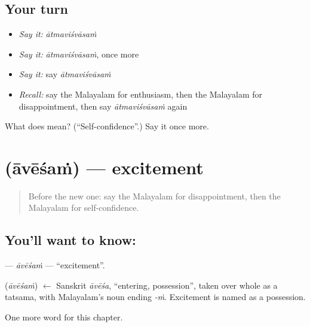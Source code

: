 \subsection*{Your turn}
\begin{itemize}
\raggedright
  \item \emph{Say it:} \emph{ātmaviśvāsaṁ}
  \item \emph{Say it:} \emph{ātmaviśvāsaṁ}, once more
  \item \emph{Say it:} say \emph{ātmaviśvāsaṁ}
  \item \emph{Recall:} say the Malayalam for enthusiasm, then the Malayalam for disappointment, then say \emph{ātmaviśvāsaṁ} again
\end{itemize}

\begin{tcolorbox}[breakable,colback=teal!4,colframe=teal!35!black,title={Before you move on}]
What does  mean? (\textquotedblleft{}Self-confidence\textquotedblright{}.) Say it once more.
\end{tcolorbox}
\section[\texorpdfstring{\ml{ആവേശം} (āvēśaṁ)}{ആവേശം (āvēśaṁ)}]{ (āvēśaṁ) — excitement}

\label{lesson:ML-C234-avesam}



\begin{quote}
Before the new one: say the Malayalam for disappointment, then the Malayalam for self-confidence.
\end{quote}

\subsection*{You'll want to know: }
\textbf{} — \emph{āvēśaṁ} — \textquotedblleft{}excitement\textquotedblright{}.

\begin{cousinweb}
\textbf{} (\emph{āvēśaṁ}) $\leftarrow$ Sanskrit \emph{āvēśa}, \textquotedblleft{}entering, possession\textquotedblright{}, taken over whole as a tatsama, with Malayalam's noun ending \emph{-ṁ}. Excitement is named as a possession.
\end{cousinweb}

\begin{grammarlens}[title={What you've built}]
One more word for this chapter.
\end{grammarlens}


